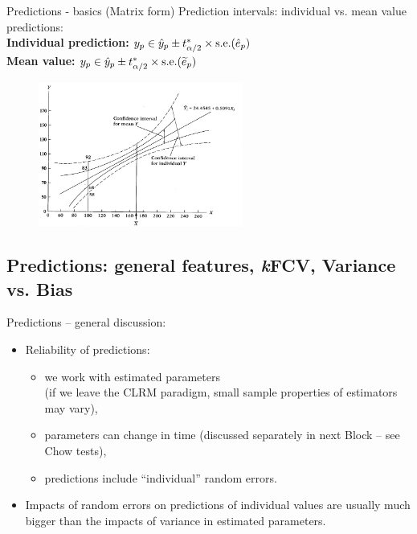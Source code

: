 \documentclass{beamer}
\begin{document}
\begin{frame}{Predictions - basics (Matrix form)}
Prediction intervals: individual vs. mean value predictions:\\
\vspace{0.3cm}
\textbf{Individual prediction:} $y_p \in \hat{y}_p \pm t^*_{\alpha/2} \times \textnormal{s.e.}(\hat{e}_p)$\\
\vspace{0.3cm}
\textbf{Mean value:} \hspace{1.7cm} $y_p \in \hat{y}_p \pm t^*_{\alpha/2} \times \textnormal{s.e.}(\widetilde{e}_p)$

\begin{figure}
\includegraphics[width=0.6\textwidth]{img/P3_PredError.jpg}
\end{figure}

\end{frame}

\subsection{Predictions: general features, \textit{k}FCV, Variance vs. Bias}
\begin{frame}{Predictions -- general discussion:}
\begin{itemize}
\item Reliability of predictions: \\ \bigskip

\begin{itemize}

\item we work with estimated parameters \\(if we leave the CLRM paradigm, small sample properties of estimators may vary),
\medskip
\item parameters can change in time (discussed separately in next Block -- see Chow tests),
\medskip
\item predictions include ``individual'' random errors.
\end{itemize}
\vspace{0.3cm}
\item Impacts of random errors on predictions of individual values are usually much bigger than the impacts of variance in estimated parameters.
\end{itemize}
\end{frame}
\end{document}
